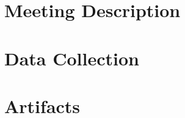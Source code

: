 \documentclass[12pt]{article} %
\begin{document}
\section{Meeting Description} %

\section{Data Collection} %

\section{Artifacts} %
\end{document}
